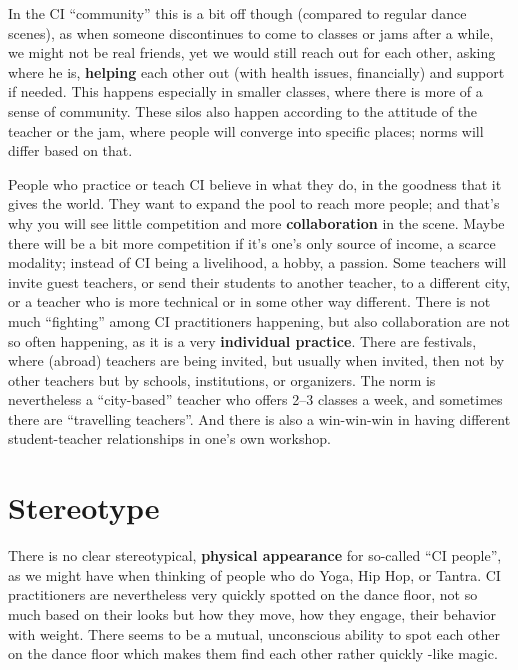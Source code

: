 In the CI ``community'' this is a bit off though (compared to regular dance scenes), as when someone discontinues to come to classes or jams after a while, we might not be real friends, yet we would still reach out for each other, asking where he is, \textbf{helping} each other out (with health issues, financially) and support if needed.
This happens especially in smaller classes, where there is more of a sense of community.
These silos also happen according to the attitude of the teacher or the jam, where people will converge into specific places; norms will differ based on that.

People who practice or teach CI believe in what they do, in the goodness that it gives the world.
They want to expand the pool to reach more people; and that's why you will see little competition and more \textbf{collaboration} in the scene.
Maybe there will be a bit more competition if it's one's only source of income, a scarce modality; instead of CI being a livelihood, a hobby, a passion.
Some teachers will invite guest teachers, or send their students to another teacher, to a different city, or a teacher who is more technical or in some other way different.
There is not much ``fighting'' among CI practitioners happening, but also collaboration are not so often happening, as it is a very \textbf{individual practice}.
There are festivals, where (abroad) teachers are being invited, but usually when invited, then not by other teachers but by schools, institutions, or organizers.
The norm is nevertheless a ``city-based'' teacher who offers 2--3 classes a week, and sometimes there are ``travelling teachers''.
And there is also a win-win-win in having different student-teacher relationships in one's own workshop.

\section{Stereotype}\label{sec:stereotype}

There is no clear stereotypical, \textbf{physical appearance} for so-called ``CI people'', as we might have when thinking of people who do Yoga, Hip Hop, or Tantra.
CI practitioners are nevertheless very quickly spotted on the dance floor, not so much based on their looks but how they move, how they engage, their behavior with weight.
There seems to be a mutual, unconscious ability to spot each other on the dance floor which makes them find each other rather quickly -like magic.

